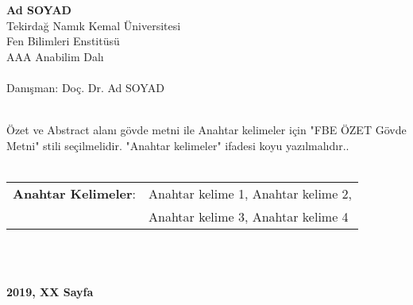 \begin{center}
	
\textbf{Ad SOYAD}\\
Tekirdağ Namık Kemal Üniversitesi\\
Fen Bilimleri Enstitüsü\\
AAA Anabilim Dalı\\~\\
Danışman: Doç. Dr. Ad SOYAD
\\~\\
\end{center}

Özet ve Abstract alanı gövde metni ile Anahtar kelimeler için "FBE ÖZET Gövde Metni" stili seçilmelidir. "Anahtar kelimeler" ifadesi koyu yazılmalıdır..
\\~\\
\begin{tabular}{ll}
	\textbf{Anahtar Kelimeler}:& Anahtar kelime 1, Anahtar kelime 2, \\
	& Anahtar kelime 3, Anahtar kelime 4
\end{tabular}
\\~\\
\begin{center}
	\textbf{2019, XX Sayfa}
\end{center}


